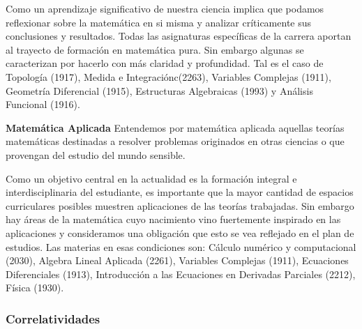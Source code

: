 \documentclass[a4paper, 12pt]{article}
\begin{document}
\begin{description}
Como un aprendizaje significativo de nuestra ciencia implica que podamos reflexionar sobre la matemática en si  misma y analizar críticamente sus conclusiones y resultados. Todas las asignaturas específicas  de la carrera aportan al trayecto de formación en matemática pura. Sin embargo algunas se caracterizan por hacerlo con más claridad y profundidad. Tal es el caso de Topología (1917), Medida e Integraciónc(2263), Variables Complejas (1911), Geometría Diferencial (1915), Estructuras Algebraicas (1993) y Análisis Funcional (1916). 

 
\item{\textbf{Matemática Aplicada}} Entendemos por matemática aplicada aquellas teorías matemáticas destinadas a resolver problemas originados en  otras ciencias o que provengan del estudio  del  mundo sensible. 

Como un objetivo central en la actualidad es la formación integral e interdisciplinaria del estudiante, es importante que la mayor cantidad de  espacios curriculares posibles muestren aplicaciones de las teorías trabajadas. Sin embargo hay áreas de la matemática cuyo  nacimiento
vino fuertemente inspirado en las aplicaciones y consideramos una obligación que esto se vea reflejado en el plan de estudios. Las materias en esas condiciones son: Cálculo numérico y computacional (2030), Algebra Lineal Aplicada (2261), Variables Complejas (1911), Ecuaciones Diferenciales (1913), Introducción a las Ecuaciones en Derivadas Parciales (2212), Física (1930).




\end{description}



\subsubsection{Correlatividades}
 
\end{document}
